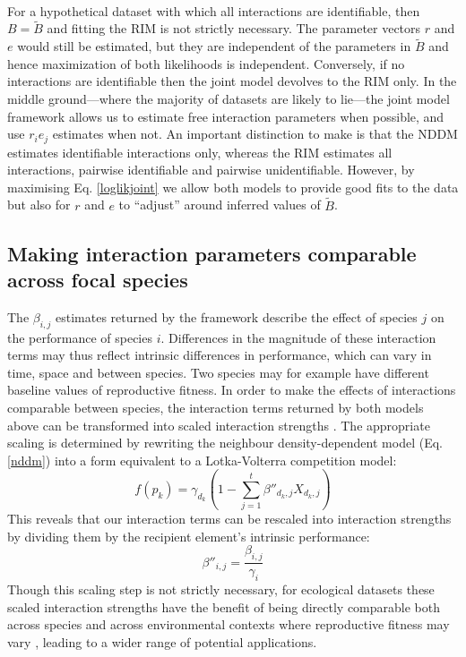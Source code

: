 \documentclass[a4,12pt]{article}
\begin{document}
    \paragraph{}
    For a hypothetical dataset with which all interactions are identifiable, then $B = \tilde B$ and fitting the RIM is not strictly necessary. The parameter vectors $r$ and $e$ would still be estimated, but they are independent of the parameters in $\tilde B$ and hence maximization of both likelihoods is independent. Conversely, if no interactions are identifiable then the joint model devolves to the RIM only. In the middle ground---where the majority of datasets are likely to lie---the joint model framework allows us to estimate free interaction parameters when possible, and use $r_i e_j$ estimates when not. An important distinction to make is that the NDDM estimates identifiable interactions only, whereas the RIM estimates all interactions, pairwise identifiable and pairwise unidentifiable. However, by maximising Eq. \ref{loglikjoint} we allow both models to provide good fits to the data but also for $r$ and $e$ to ``adjust'' around inferred values of $\tilde B$. 


    \subsection{Making interaction parameters comparable across focal species} 

        The $\beta_{i, j}$ estimates returned by the framework describe the effect of species $j$ on the performance of species $i$. Differences in the magnitude of these interaction terms may thus reflect intrinsic differences in performance, which can vary in time, space and between species. Two species may for example have different baseline values of reproductive fitness. In order to make the effects of interactions comparable between species, the interaction terms returned by both models above can be transformed into scaled interaction strengths \parencite{Laska1998}. The appropriate scaling is determined by rewriting the neighbour density-dependent model (Eq. \ref{nddm}) into a form equivalent to a Lotka-Volterra competition model: 
        \begin{equation}
        f(p_{k}) = \gamma_{d_k} \left ( 1 - \sum_{j=1}^{t} {\beta}''_{d_k, j} X_{d_k, j} \right )
        \label{LVform}
        \end{equation}
        This reveals that our interaction terms can be rescaled into interaction strengths by dividing them by the recipient element's intrinsic performance:  
        \begin{equation}
        {\beta}''_{i, j} = \frac{\beta_{i, j}}{\gamma_{i}}
        \label{scaling}
        \end{equation}
        Though this scaling step is not strictly necessary, for ecological datasets these scaled interaction strengths have the benefit of being directly comparable both across species and across environmental contexts where reproductive fitness may vary \parencite{Wootton2005}, leading to a wider range of potential applications.
\end{document}
